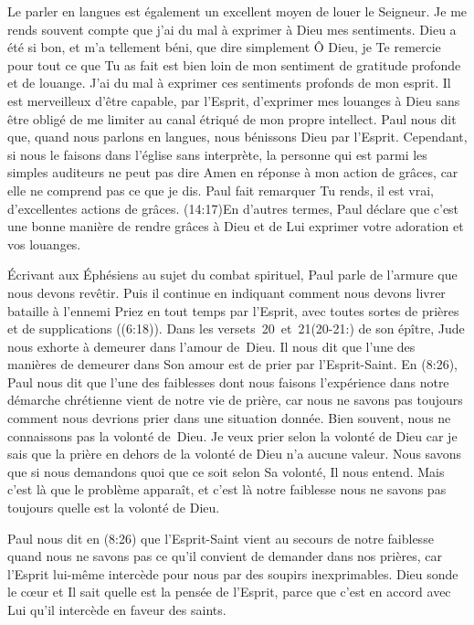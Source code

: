 Le parler en langues est également un excellent moyen de louer le Seigneur.
 Je me rends souvent compte que j'ai du mal à exprimer à Dieu mes sentiments.
 Dieu a été si bon, et m'a tellement béni, que dire simplement\frcolon{}
 \Og Ô Dieu, je Te remercie pour tout ce que Tu as fait \Fg{}
 est bien loin de mon sentiment de gratitude profonde et de louange.
 J'ai du mal à exprimer ces sentiments profonds de mon esprit.
 Il est merveilleux d'être capable, par l'Esprit, d'exprimer mes louanges
 à Dieu sans être obligé de me limiter au canal étriqué
 de mon propre intellect. Paul nous dit que, quand nous parlons en langues,
 nous bénissons Dieu par l'Esprit. Cependant, si nous le faisons
 dans l'église sans interprète, la personne qui est parmi les simples auditeurs
 ne peut pas dire \Og Amen \Fg{} en réponse à mon action de grâces,
 car elle ne comprend pas ce que je dis. Paul fait remarquer\frcolon{}
 \Og Tu rends, il est vrai, d'excellentes actions de grâces. \Fg{}
 (14:17)En d'autres termes,
 Paul déclare que c'est une bonne manière
 de rendre grâces à Dieu et de Lui exprimer votre adoration et vos louanges.

Écrivant aux Éphésiens au sujet du combat spirituel, Paul parle de l'armure
 que nous devons revêtir. Puis il continue en indiquant comment
 nous devons livrer bataille à l'ennemi\frcolon{}
 \Og Priez en tout temps par l'Esprit, avec toutes sortes de prières
 et de supplications \Fg{} ((6:18)).
 Dans les versets~20~et~21(20-21:) de son épître,
 Jude nous exhorte à demeurer dans l'amour de~Dieu.
 Il nous dit que l'une des manières de demeurer dans Son amour est de prier
 par l'Esprit-Saint. En (8:26), Paul nous dit que l'une
 des faiblesses dont nous faisons l'expérience 
 dans notre démarche
 chrétienne vient de notre vie de prière, car nous ne savons pas toujours
 comment nous devrions prier dans une situation donnée.
 Bien souvent, nous ne connaissons pas la volonté de~Dieu.
 Je veux prier selon la volonté de Dieu car je sais que la prière en dehors
 de la volonté de Dieu n'a aucune valeur. Nous savons que si nous demandons
 quoi que ce soit selon Sa volonté, Il nous entend.
 Mais c'est là que le problème apparaît, et c'est là notre faiblesse\frcolon{}
 nous ne savons pas toujours quelle est la volonté de Dieu.

Paul nous dit en (8:26) que l'Esprit-Saint vient au secours
 de notre faiblesse quand nous ne savons pas ce qu'il convient de demander dans nos prières,
 car l'Esprit lui-même intercède pour nous par des soupirs inexprimables.
 Dieu sonde le cœur et Il sait quelle est la pensée de l'Esprit,
 parce que c'est en accord avec Lui qu'il intercède en faveur des saints.

